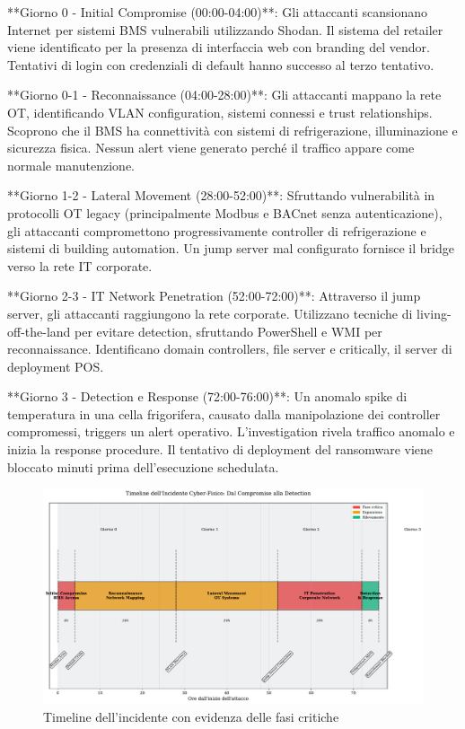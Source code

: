 **Giorno 0 - Initial Compromise (00:00-04:00)**: Gli attaccanti scansionano Internet per sistemi BMS vulnerabili utilizzando Shodan. Il sistema del retailer viene identificato per la presenza di interfaccia web con branding del vendor. Tentativi di login con credenziali di default hanno successo al terzo tentativo.

**Giorno 0-1 - Reconnaissance (04:00-28:00)**: Gli attaccanti mappano la rete OT, identificando VLAN configuration, sistemi connessi e trust relationships. Scoprono che il BMS ha connettività con sistemi di refrigerazione, illuminazione e sicurezza fisica. Nessun alert viene generato perché il traffico appare come normale manutenzione.

**Giorno 1-2 - Lateral Movement (28:00-52:00)**: Sfruttando vulnerabilità in protocolli OT legacy (principalmente Modbus e BACnet senza autenticazione), gli attaccanti compromettono progressivamente controller di refrigerazione e sistemi di building automation. Un jump server mal configurato fornisce il bridge verso la rete IT corporate.

**Giorno 2-3 - IT Network Penetration (52:00-72:00)**: Attraverso il jump server, gli attaccanti raggiungono la rete corporate. Utilizzano tecniche di living-off-the-land per evitare detection, sfruttando PowerShell e WMI per reconnaissance. Identificano domain controllers, file server e critically, il server di deployment POS.

**Giorno 3 - Detection e Response (72:00-76:00)**: Un anomalo spike di temperatura in una cella frigorifera, causato dalla manipolazione dei controller compromessi, triggers un alert operativo. L'investigation rivela traffico anomalo e inizia la response procedure. Il tentativo di deployment del ransomware viene bloccato minuti prima dell'esecuzione schedulata.

\begin{figure}[htbp]
\centering
\includegraphics[width=\textwidth]{thesis_figures/cap4/figura_4_3_timeline_incidente.pdf}
\caption{Timeline dell'incidente con evidenza delle fasi critiche}
\label{fig:timeline_incidente}
\end{figure}

